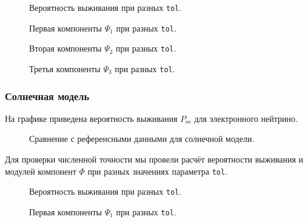 \documentclass[12pt]{article}
\begin{document}
\begin{figure}[htb]
  \hspace*{-2em}
  \caption{\label{fig:4}Вероятность выживания при разных \texttt{tol}.}
\end{figure}

\begin{figure}[htb]
  \hspace*{-2em}
  \caption{\label{fig:5}Первая компоненты \(\Psi_{1}\) при разных \texttt{tol}.}
\end{figure}

\begin{figure}[htb]
  \hspace*{-2em}
  \caption{\label{fig:6}Вторая компоненты \(\Psi_{2}\) при разных \texttt{tol}.}
\end{figure}

\begin{figure}[htb]
  \hspace*{-2em}
  \caption{\label{fig:7}Третья компоненты \(\Psi_{3}\) при разных \texttt{tol}.}
\end{figure}

\subsubsection*{Солнечная модель}

На графике приведена вероятность выживания \(P_{\text{ee}}\) для электронного
нейтрино.
\begin{figure}[htb]
  \hspace*{-2em}
  \caption{\label{fig:2}Сравнение с референсными данными для солнечной модели.}
\end{figure}

Для проверки численной точности мы провели расчёт вероятности выживания и
модулей компонент \(\Phi\) при разных значениях параметра \verb|tol|.

\begin{figure}[htb]
  \hspace*{-2em}
  \caption{\label{fig:8}Вероятность выживания при разных \texttt{tol}.}
\end{figure}

\begin{figure}[htb]
  \hspace*{-2em}
  \caption{\label{fig:9}Первая компоненты \(\Psi_{1}\) при разных \texttt{tol}.}
\end{figure}
\end{document}
